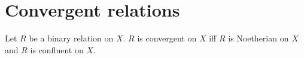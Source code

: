 


\section{Convergent relations}

\begin{definition}\label{convergent_on}
    Let $R$ be a binary relation on $X$.
    $R$ is convergent on $X$ iff
        $R$ is Noetherian on $X$ and $R$ is confluent on $X$.
\end{definition}
